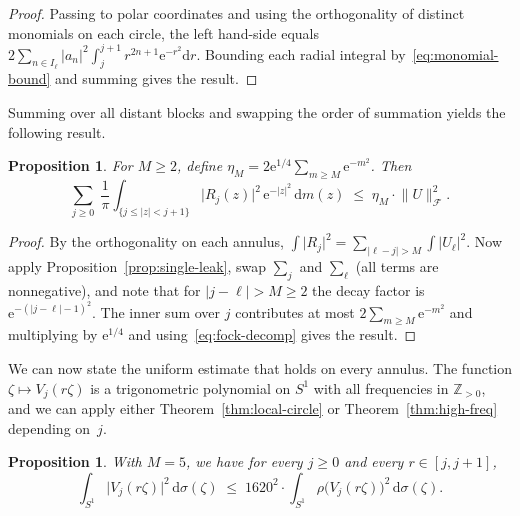 \documentclass[11pt]{amsart}
\newtheorem{proposition}[theorem]{Proposition}
\newtheorem{corollary}[theorem]{Corollary}
\theoremstyle{remark}
\begin{document}
\begin{proof}
Passing to polar coordinates and using the orthogonality of distinct
monomials on each circle, the left hand-side equals
$2\sum_{n \in I_\ell}\lvert a_n \rvert^2 \int_j^{j+1} r^{2n+1}\mathrm{e}^{-r^2}\mathrm{d} r$.
Bounding each radial integral by~\eqref{eq:monomial-bound} and summing gives the result.
\end{proof}

Summing over all distant blocks and swapping the order of summation
yields the following result.

\begin{proposition}\label{prop:total-leak} For $M \ge 2$, define $\eta_M = 2\mathrm{e}^{1/4}\sum_{m \ge M}\mathrm{e}^{-m^2}$.  Then
\[
\sum_{j \ge 0}\;
\frac{1}{\pi}\int_{\{j \le \lvert z \rvert < j+1\}}
\lvert R_j(z) \rvert^2\, \mathrm{e}^{-\lvert z \rvert^2}\,\mathrm{d} m(z)
\;\le\;
\eta_M \cdot \lVert U \rVert_\mathcal{F}^2.
\]
\end{proposition}

\begin{proof}
By the orthogonality on each annulus,
$\int \lvert R_j \rvert^2 = \sum_{\lvert \ell-j \rvert>M}\int\lvert U_\ell \rvert^2$.
Now apply Proposition~\ref{prop:single-leak}, swap $\sum_j$ and $\sum_\ell$
(all terms are nonneg\-ative), and note that for $\lvert j-\ell \rvert > M \ge 2$
the decay factor is $\mathrm{e}^{-(\lvert j-\ell \rvert-1)^2}$.  The inner sum over
$j$ contributes at most $2\sum_{m \ge M}\mathrm{e}^{-m^2}$ and multiplying by
$\mathrm{e}^{1/4}$ and using~\eqref{eq:fock-decomp} gives the result.
\end{proof}


We can now state the uniform estimate that holds on every annulus.  The
function $\zeta \mapsto V_j(r\zeta)$ is a trigonometric polynomial on $S^1$
with all frequencies in $\mathbb{Z}_{>0}$, and we can apply either
Theorem~\ref{thm:local-circle} or Theorem~\ref{thm:high-freq} depending
on~$j$.

\begin{proposition}\label{prop:annulus} With $M = 5$, we have for every $j \ge 0$ and every $r \in [j, j{+}1]$,
\[
\int_{S^1}\lvert V_j(r\zeta) \rvert^2\,\mathrm{d}\sigma(\zeta)
\;\le\;
1620^2 \cdot
\int_{S^1}\rho\bigl(V_j(r\zeta)\bigr)^2\,\mathrm{d}\sigma(\zeta).
\]
\end{proposition}
\end{document}
